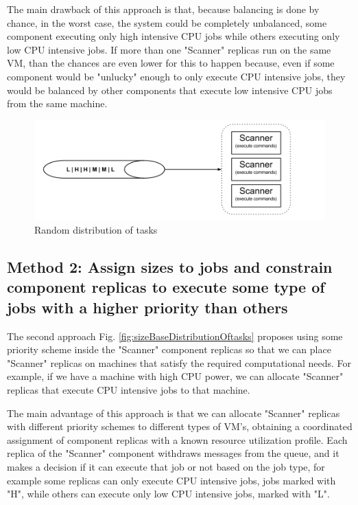 The main drawback of this approach is that, because balancing is done by chance, in the worst case, the system could be completely unbalanced, some component executing only high intensive CPU jobs while others executing only low CPU intensive jobs. If more than one "Scanner" replicas run on the same VM, than the chances are even lower for this to happen because, even if some component would be "unlucky" enough to only execute CPU intensive jobs, they would be balanced by other components that execute low intensive CPU jobs from the same machine.

\begin{figure}[ht]
\centering
\includegraphics[width=\linewidth]{./img/1_NaturalLoadBalancing.png}
\caption{Random distribution of tasks}
\label{fig:randomDistributionsOfTasks}
\end{figure}

\subsection{Method 2: Assign sizes to jobs and constrain component replicas to execute some type of jobs with a higher priority than others}
\label{subsection:method2}
The second approach Fig. \ref{fig:sizeBaseDistributionOftasks} proposes using some priority scheme inside the "Scanner" component replicas so that we can place "Scanner" replicas on machines that satisfy the required computational needs. For example, if we have a machine with high CPU power, we can allocate "Scanner" replicas that execute CPU intensive jobs to that machine. 

The main advantage of this approach is that we can allocate "Scanner" replicas with different priority schemes to different types of VM's, obtaining a coordinated assignment of component replicas with a known resource utilization profile. Each replica of the "Scanner" component withdraws messages from the queue, and it makes a decision if it can execute that job or not based on the job type, for example some replicas can only execute CPU intensive jobs, jobs marked with "H", while others can execute only low CPU intensive jobs, marked with "L". 

